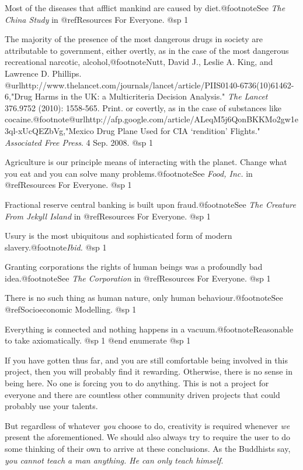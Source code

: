 \item
Most of the diseases that afflict mankind are caused by diet.@footnote{See {\it The China Study} in @ref{Resources For Everyone}.}
@sp 1

\item
The majority of the presence of the most dangerous drugs in society are attributable to government, either overtly, as in the case of the most dangerous recreational narcotic, alcohol,@footnote{Nutt, David J., Leslie A. King, and Lawrence D. Phillips. @url{http://www.thelancet.com/journals/lancet/article/PIIS0140-6736(10)61462-6,"Drug Harms in the UK: a Multicriteria Decision Analysis."} {\it The Lancet} 376.9752 (2010): 1558-565. Print.} or covertly, as in the case of substances like cocaine.@footnote{@url{http://afp.google.com/article/ALeqM5j6QonBKKMo2gw1e3ql-xUcQEZbVg,"Mexico Drug Plane Used for CIA ‘rendition’ Flights."} {\it Associated Free Press}. 4 Sep. 2008.}
@sp 1

\item
Agriculture is our principle means of interacting with the planet. Change what you eat and you can solve many problems.@footnote{See {\it Food, Inc.} in @ref{Resources For Everyone}.}
@sp 1

\item
Fractional reserve central banking is built upon fraud.@footnote{See {\it The Creature From Jekyll Island} in @ref{Resources For Everyone}.}
@sp 1

\item
Usury is the most ubiquitous and sophisticated form of modern slavery.@footnote{{\it Ibid.}}
@sp 1

\item
Granting corporations the rights of human beings was a profoundly bad idea.@footnote{See {\it The Corporation} in @ref{Resources For Everyone}.}
@sp 1

\item
There is no such thing as human nature, only human behaviour.@footnote{See @ref{Socioeconomic Modelling}.}
@sp 1

\item
Everything is connected and nothing happens in a vacuum.@footnote{Reasonable to take axiomatically.}
@sp 1
@end enumerate
@sp 1

If you have gotten thus far, and you are still comfortable being involved in this project, then you will probably find it rewarding. Otherwise, there is no sense in being here. No one is forcing you to do anything. This is not a project for everyone and there are countless other community driven projects that could probably use your talents.

But regardless of whatever {\it you} choose to do, creativity is required whenever {\it we} present the aforementioned. We should also always try to require the user to do some thinking of their own to arrive at these conclusions. As the Buddhists say, {\it you cannot teach a man anything. He can only teach himself}.

